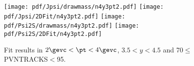 \begin{figure}[H]
\begin{center}
\texttt{[image: pdf/Jpsi/drawmass/n4y3pt2.pdf]}
\texttt{[image: pdf/Jpsi/2DFit/n4y3pt2.pdf]}
\vspace*{-0.5cm}
\texttt{[image: pdf/Psi2S/drawmass/n4y3pt2.pdf]}
\texttt{[image: pdf/Psi2S/2DFit/n4y3pt2.pdf]}
\vspace*{-0.5cm}
\end{center}
\caption{Fit results in $2\gevc<\pt<4\gevc$, $3.5<y<4.5$ and 70$\leq$PVNTRACKS$<$95.}
\label{Fitn4y3pt2}
\end{figure}
